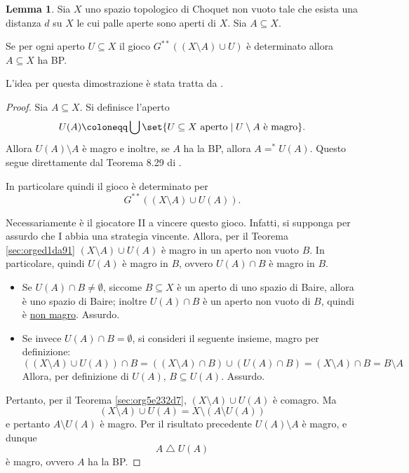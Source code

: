 \documentclass[titlepage]{article}
\newcommand{\1}{\mathds{1}}
\theoremstyle{definition}%
\newtheorem{lem}[thm]{Lemma}
\theoremstyle{plain}
\theoremstyle{remark}
\begin{document}
\begin{lem}\label{sec:org29f61ee}
Sia \(X\) uno {spazio topologico} {di Choquet} non {vuoto} tale che esista una {distanza} \(d\) su \(X\) le cui {palle aperte} sono aperti di \(X\). Sia \(A \subseteq X\).

Se per ogni aperto \(U \subseteq X\) il {gioco} \(G^{**}\left((X\setminus A)\cup U\right)\) è {determinato} allora \(A \subseteq X\) ha {BP}.
\end{lem}

L'idea per questa dimostrazione è stata tratta da \cite{mathoverflow}.

\begin{proof}
Sia \(A \subseteq X\). Si definisce l'aperto
\begin{equation*}
U(A) \coloneqq \bigcup \set{
U\subseteq X\text{ aperto}\mid U\setminus A\text{ è magro}
}.
\end{equation*}
Allora \(U(A)\setminus A\) è magro e inoltre, se \(A\) ha la BP, allora \(A\mathrel{=^{*}} U(A)\). Questo segue direttamente dal Teorema 8.29 di \cite{kechris}.

In particolare quindi il gioco è determinato  per
\begin{equation*}
G^{**}\left((X\setminus A)\cup U(A)\right).
\end{equation*}

Necessariamente è il giocatore II a vincere questo gioco. Infatti, si supponga per assurdo che I abbia una strategia vincente. Allora, per il Teorema \ref{sec:orged1da91} \((X\setminus A)\cup U(A)\) è magro in un aperto non vuoto \(B\). In particolare, quindi \(U(A)\) è magro in \(B\), ovvero \(U(A)\cap B\) è magro in \(B\).
\begin{itemize}
\item Se \(U(A)\cap B\neq\emptyset\), siccome \(B \subseteq X\) è un aperto di uno spazio di Baire, allora è uno spazio di Baire; inoltre \(U(A)\cap B\) è un aperto non vuoto di \(B\), quindi è \uline{non magro}. Assurdo.
\item Se invece \(U(A)\cap B = \emptyset\), si consideri il seguente insieme, magro per definizione:
\begin{equation*}
  \left((X\setminus A)\cup U(A)\right) \cap B = \left((X\setminus A)\cap B\right) \cup \left(U(A)\cap B\right) = (X\setminus A)\cap B = B\setminus A
\end{equation*}
Allora, per definizione di \(U(A)\), \(B \subseteq U(A)\). Assurdo.
\end{itemize}

Pertanto, per il {Teorema \ref{sec:org5e232d7}}, \((X\setminus A)\cup U(A)\) è comagro. Ma
\begin{equation*}
(X\setminus A)\cup U(A) = X \setminus\left(A\setminus U(A)\right)
\end{equation*}
e pertanto \(A\setminus U(A)\) è magro. Per il risultato precedente \(U(A)\setminus A\) è magro, e dunque
\begin{equation*}
A\mathrel{\triangle}U(A)
\end{equation*}
è magro, ovvero \(A\) ha la BP.
\end{proof}
\end{document}
